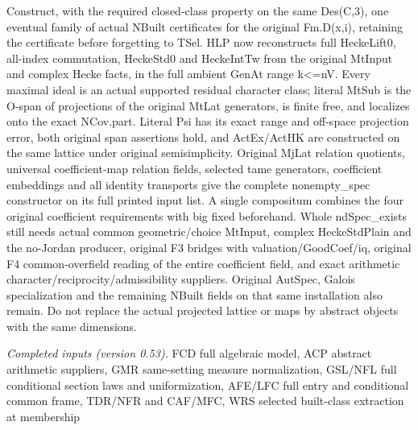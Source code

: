\documentclass[11pt,a4paper]{article}
\numberwithin{equation}{section}
\theoremstyle{remark}\newtheorem{remark}[theorem]{Remark}
\begin{document}
Construct, with the required closed-class property on the same Des(C,3), one eventual family of actual NBuilt certificates for the original Fm.D(x,i), retaining the certificate before forgetting to TSel. HLP now reconstructs full HeckeLift0, all-index commutation, HeckeStd0 and HeckeIntTw from the original MtInput and complex Hecke facts, in the full ambient GenAt range k<=nV. Every maximal ideal is an actual supported residual character class; literal MtSub is the O-span of projections of the original MtLat generators, is finite free, and localizes onto the exact NCov.part. Literal Psi has its exact range and off-space projection error, both original span assertions hold, and ActEx/ActHK are constructed on the same lattice under original semisimplicity. Original MjLat relation quotients, universal coefficient-map relation fields, selected tame generators, coefficient embeddings and all identity transports give the complete nonempty\_\allowbreak spec constructor on its full printed input list. A single compositum combines the four original coefficient requirements with big fixed beforehand. Whole ndSpec\_\allowbreak exists still needs actual common geometric/choice MtInput, complex HeckeStdPlain and the no-Jordan producer, original F3 bridges with valuation/GoodCoef/iq, original F4 common-overfield reading of the entire coefficient field, and exact arithmetic character/reciprocity/admissibility suppliers. Original AutSpec, Galois specialization and the remaining NBuilt fields on that same installation also remain. Do not replace the actual projected lattice or maps by abstract objects with the same dimensions.

\emph{Completed inputs (version 0.53).} FCD full algebraic model, ACP abstract arithmetic suppliers, GMR same-setting measure normalization, GSL/NFL full conditional section laws and uniformization, AFE/LFC full entry and conditional common frame, TDR/NFR and CAF/MFC, WRS selected built-class extraction at membership
\end{document}
